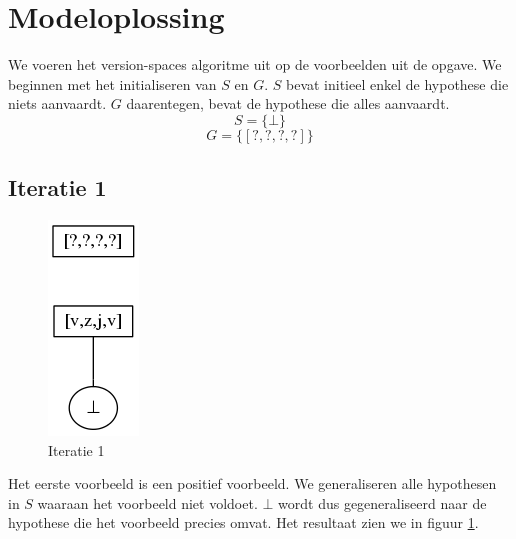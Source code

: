 \documentclass[alternative-exam.tex]{subfiles}
\begin{document}
\section{Modeloplossing}
We voeren het version-spaces algoritme uit op de voorbeelden uit de opgave. We beginnen met het initialiseren van $S$ en $G$. $S$ bevat initieel enkel de hypothese die niets aanvaardt. $G$ daarentegen, bevat de hypothese die alles aanvaardt.
\[
S = \{\bot\}
\]
\[
G = \{[?,?,?,?]\}
\]
\subsection{Iteratie 1}
\begin{figure}
[H]
\centering
\caption{Iteratie 1}
\label{iter_1}
\includegraphics[scale=0.5]{resources/graphs/iteration_1.png}
\end{figure}
Het eerste voorbeeld is een positief voorbeeld. We generaliseren alle hypothesen in $S$ waaraan het voorbeeld niet voldoet. $\bot$ wordt dus gegeneraliseerd naar de hypothese die het voorbeeld precies omvat. Het resultaat zien we in figuur \ref{iter_1}.
\end{document}
